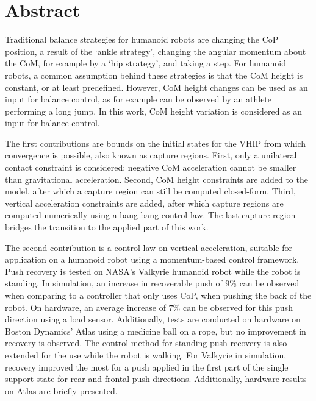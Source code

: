 %
\chapter*{Abstract}%

Traditional balance strategies for humanoid robots are changing the \ac{CoP} position, a result of the `ankle strategy', changing the angular momentum about the \ac{CoM}, for example by a `hip strategy', and taking a step. For humanoid robots, a common assumption behind these strategies is that the \ac{CoM} height is constant, or at least predefined. However, \ac{CoM} height changes can be used as an input for balance control, as for example can be observed by an athlete performing a long jump. In this work, \ac{CoM} height variation is considered as an input for balance control. 

The first contributions are bounds on the initial states for the \ac{VHIP} from which convergence is possible, also known as capture regions. First, only a unilateral contact constraint is considered; negative \ac{CoM} acceleration cannot be smaller than gravitational acceleration. Second, \ac{CoM} height constraints are added to the model, after which a capture region can still be computed closed-form. Third, vertical acceleration constraints are added, after which capture regions are computed numerically using a bang-bang control law. The last capture region bridges the transition to the applied part of this work.

The second contribution is a control law on vertical acceleration, suitable for application on a humanoid robot using a momentum-based control framework. Push recovery is tested on NASA's Valkyrie humanoid robot while the robot is standing. In simulation, an increase in recoverable push of $9$\% can be observed when comparing to a controller that only uses \ac{CoP}, when pushing the back of the robot. On hardware, an average increase of $7$\% can be observed for this push direction using a load sensor. Additionally, tests are conducted on hardware on Boston Dynamics' Atlas using a medicine ball on a rope, but no improvement in recovery is observed. The control method for standing push recovery is also extended for the use while the robot is walking. For Valkyrie in simulation, recovery improved the most for a push applied in the first part of the single support state for rear and frontal push directions. Additionally, hardware results on Atlas are briefly presented.
